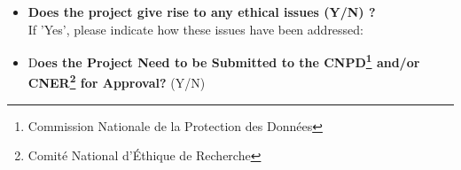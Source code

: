 % 

\begin{itemize}
  \item \textbf{Does the project give rise to any ethical issues (Y/N) ?}
    \\
    If 'Yes', please indicate how these issues have been addressed:
    
  \item D\textbf{oes the Project Need to be Submitted to the
      CNPD\footnote{Commission Nationale de la Protection des Donn\'ees} and/or
      CNER\footnote{Comit\'e National d'\'Ethique de Recherche} for Approval?}
    (Y/N)
    \\
\end{itemize}




%
